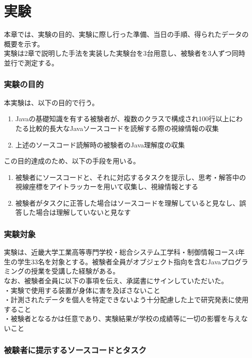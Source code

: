 \documentclass[paper=a4paper,fontsize=11pt]{jlreq}
\begin{document}
\part{実験}
  本章では、実験の目的、実験に際し行った準備、当日の手順、得られたデータの概要を示す。\\
  実験は2章で説明した手法を実装した実験台を3台用意し、被験者を3人ずつ同時並行で測定する。

  \section{実験の目的}
    本実験は、以下の目的で行う。
    \begin{enumerate}
      \item Javaの基礎知識を有する被験者が、複数のクラスで構成され100行以上にわたる比較的長大なJavaソースコードを読解する際の視線情報の収集
      \item 上述のソースコード読解時の被験者のJava理解度の収集
    \end{enumerate}

    この目的達成のため、以下の手段を用いる。
    \begin{enumerate}
      \item 被験者にソースコードと、それに対応するタスクを提示し、思考・解答中の視線座標をアイトラッカーを用いて収集し、視線情報とする
      \item 被験者がタスクに正答した場合はソースコードを理解していると見なし、誤答した場合は理解していないと見なす
    \end{enumerate}

  \section{実験対象}
    実験は、近畿大学工業高等専門学校・総合システム工学科・制御情報コース4年生の学生33名を対象とする。被験者全員がオブジェクト指向を含むJavaプログラミングの授業を受講した経験がある。\\
    なお、被験者全員に以下の事項を伝え、承諾書にサインしていただいた。\\
    ・実験で使用する装置が身体に害を及ぼさないこと\\
    ・計測されたデータを個人を特定できないよう十分配慮した上で研究発表に使用すること\\
    ・被験者となるかは任意であり、実験結果が学校の成績等に一切の影響を与えないこと\\

  \section{被験者に提示するソースコードとタスク}
\end{document}
